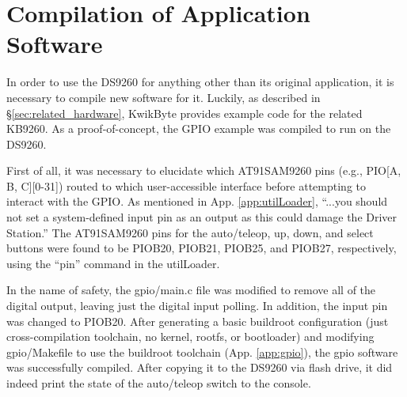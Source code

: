 \documentclass[]{article}
\begin{document}
\section{Compilation of Application Software}
\label{sec:compilation}
\par In order to use the DS9260 for anything other than its original application, it is necessary to compile new software for it. Luckily, as described in \S\ref{sec:related_hardware}, KwikByte provides example code for the related KB9260. As a proof-of-concept, the GPIO example was compiled to run on the DS9260.
\par First of all, it was necessary to elucidate which AT91SAM9260 pins (e.g., PIO[A, B, C][0-31]) routed to which user-accessible interface before attempting to interact with the GPIO. As mentioned in App. \ref{app:utilLoader}, ``...you should not set a system-defined input pin as an output as this could damage the Driver Station.'' The AT91SAM9260 pins for the auto/teleop, up, down, and select buttons were found to be PIOB20, PIOB21, PIOB25, and PIOB27, respectively, using the ``pin'' command in the utilLoader. 
\par In the name of safety, the gpio/main.c file was modified to remove all of the digital output, leaving just the digital input polling. In addition, the input pin was changed to PIOB20. After generating a basic buildroot configuration (just cross-compilation toolchain, no kernel, rootfs, or bootloader) and modifying gpio/Makefile to use the buildroot toolchain (App. \ref{app:gpio}), the gpio software was successfully compiled. After copying it to the DS9260 via flash drive, it did indeed print the state of the auto/teleop switch to the console.
\end{document}
